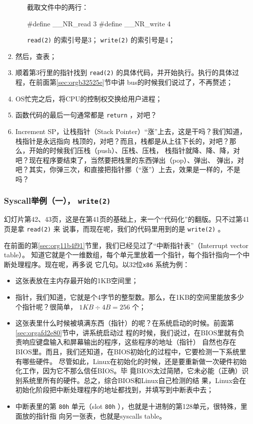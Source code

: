 \documentclass{wx672ctexart}
\newcommand\mpic[1]{%
  \marginpar{\texttt{[image: thumbnails/\#1]}}}
\begin{document}
\begin{enumerate}
\begin{itemize}
截取文件中的两行：
\begin{ccode}
#define __NR_read 3
#define __NR_write 4
\end{ccode}
\texttt{read(2)} 的索引号是3； \texttt{write(2)} 的索引号是4；
\end{itemize}
\item 然后，查表；
\item 顺着第3行里的指针找到 \texttt{read(2)} 的具体代码，并开始执行。执行的具体过程，在前面第\ref{sec:orgb32525e}节中讲
bus的时候我们说过了，不再赘述；
\item OS忙完之后，将CPU的控制权交换给用户进程；
\item 函数代码的最后一句通常都是 \texttt{return} ，对吧？
\item Increment SP，让栈指针（Stack Pointer）“涨”上去，这是干吗？我们知道，栈指针是永远指向
栈顶的，对吧？而且，栈都是从上往下长的，对吧？那么，开始的时候我们压栈（push）、压栈、压栈，
栈指针就降、降、降，对吧？现在程序要结束了，当然要把栈里的东西弹出（pop）、弹出、
弹出，对吧？其实，你弹三次，和直接把指针挪（“涨”）上去，效果是一样的，不是吗？
\end{enumerate}

\subsubsection{Syscall举例（一）， \texttt{write(2)}}
\label{sec:write}

幻灯片第42、43页，这是在第41页的基础上，来一个“代码化”的翻版。只不过第41页是拿 \texttt{read(2)} 来
说事，而现在呢，我们的代码里用到的是 \texttt{write(2)} 。

在前面的第\ref{sec:org11b4f91}节里，我们已经见过了“中断指针表”（Interrupt vector table）。
知道它就是个一维数组，每个单元里放着一个指针，每个指针指向一个中断处理程序。现在呢，再多说
它几句。以32位\texttt{x86} 系统为例：\mpic{pg_0042}
\begin{itemize}
\item 这张表放在主内存最开始的1KB空间里；
\item 指针，我们知道，它就是个4字节的整型数。那么，在1KB的空间里能放多少个指针呢？很简单，
\(1KB \div 4B = 256\) 个；
\item 这张表里什么时候被填满东西（指针）的呢？在系统启动的时候。前面第\ref{sec:orgafd2e80}节中，讲系统启动过
程的时候，我们说过，在BIOS里就有负责响应键盘输入和屏幕输出的程序，这些程序的地址（指针）
自然也存在BIOS里。而且，我们还知道，在BIOS初始化的过程中，它要检测一下系统里有哪些硬件。
尽管如此，Linux在初始化的时候，还是要重新做一次硬件初始化工作，因为它不那么信任BIOS。毕
竟BIOS太过简陋，它未必能（正确）识别系统里所有的硬件。总之，综合BIOS和Linux自己检测的结
果，Linux会在初始化阶段把中断处理程序的地址都找到，并填写到中断表中去；
\item 中断表里的第 \texttt{80h} 单元（slot \texttt{80h} ），也就是十进制的第128单元，很特殊，里面放的指针指
向另一张表，也就是syscalls table。
\end{itemize}
\end{document}
